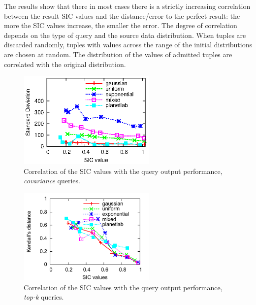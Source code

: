 The results show that there in most cases there is a strictly increasing 
correlation between the result SIC values and the distance/error to the perfect result: 
the more the SIC values increase, the smaller the error. The degree of correlation 
depends on the type of query and the source data
distribution. When tuples are discarded randomly, tuples with values across the
range of the initial distributions are chosen at random. The distribution of
the values of admitted tuples are correlated with the original distribution.

\begin{figure}[h]
\centering
\includegraphics[width=0.6\textwidth]{img/tesi/cov}
\caption{Correlation of the SIC values with the query output performance, \emph{covariance} queries.}
\label{fig:cov}
\end{figure}

\begin{figure}[h]
\centering 
\includegraphics[width=0.6\textwidth]{img/tesi/topK-distance}
\caption{Correlation of the SIC values with the query output performance, \emph{top-k} queries.}
\label{fig:top5}
\end{figure}


